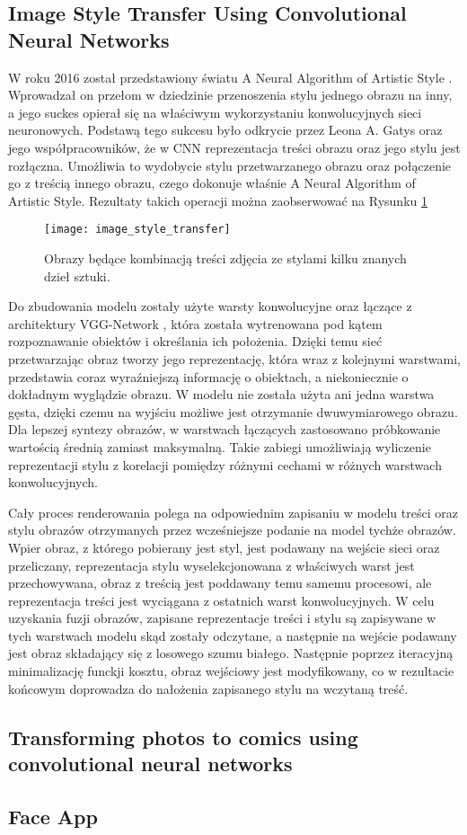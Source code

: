   \subsection{Image Style Transfer Using Convolutional Neural Networks}
    W roku 2016 został przedstawiony światu A Neural Algorithm of Artistic Style
    \cite{image_style_transfer}. Wprowadzał on przełom w dziedzinie przenoszenia
    stylu jednego obrazu na inny, a jego suckes opierał się na właściwym wykorzystaniu
    konwolucyjnych sieci neuronowych. Podstawą tego sukcesu było odkrycie przez
    Leona A. Gatys oraz jego współpracowników, że w CNN reprezentacja treści
    obrazu oraz jego stylu jest rozłączna. Umożliwia to wydobycie stylu
    przetwarzanego obrazu oraz połączenie go z treścią innego obrazu, czego
    dokonuje właśnie A Neural Algorithm of Artistic Style. Rezultaty takich
    operacji można zaobserwować na Rysunku \ref{fig:image_style_transfer}

    \begin{figure}[h]
      \centering
      \texttt{[image: image\_style\_transfer]}
      \caption{Obrazy będące kombinacją treści zdjęcia ze stylami kilku znanych dzieł sztuki.}
      \label{fig:image_style_transfer}
    \end{figure}

    Do zbudowania modelu zostały użyte warsty konwolucyjne oraz łączące z
    architektury VGG-Network \cite{vgg_network}, która została wytrenowana pod
    kątem rozpoznawanie obiektów i określania ich położenia. Dzięki temu sieć
    przetwarzając obraz tworzy jego reprezentację, która wraz z
    kolejnymi warstwami, przedstawia coraz wyraźniejszą informację o obiektach,
    a niekoniecznie o dokładnym wyglądzie obrazu.
    W modelu nie została użyta ani jedna warstwa gęsta, dzięki czemu na wyjściu
    możliwe jest otrzymanie dwuwymiarowego obrazu.
    Dla lepszej syntezy obrazów, w warstwach
    łączących zastosowano próbkowanie wartością średnią zamiast maksymalną.
    Takie zabiegi umożliwiają wyliczenie reprezentacji stylu z korelacji
    pomiędzy różnymi cechami w różnych warstwach konwolucyjnych.

    Cały proces renderowania polega na odpowiednim zapisaniu w modelu treści
    oraz stylu obrazów otrzymanych przez wcześniejsze podanie na model tychże
    obrazów. Wpier obraz, z którego pobierany jest styl, jest podawany na
    wejście sieci oraz przeliczany, reprezentacja stylu wyselekcjonowana z
    właściwych warst jest przechowywana, obraz z treścią jest poddawany temu samemu
    procesowi, ale reprezentacja treści jest wyciągana z ostatnich
    warst konwolucyjnych.
    W celu uzyskania fuzji obrazów, zapisane reprezentacje treści i stylu są
    zapisywane w tych warstwach modelu skąd zostały odczytane, a następnie na wejście
    podawany jest obraz składający się z losowego szumu białego.
    Następnie poprzez iteracyjną minimalizację funckji kosztu, obraz wejściowy jest modyfikowany, co w rezultacie końcowym doprowadza do nałożenia zapisanego
    stylu na wczytaną treść.



  \subsection{Transforming photos to comics using convolutional neural networks}

  \subsection{Face App}
